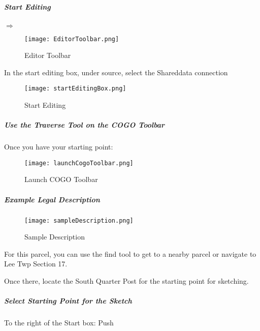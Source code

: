 \subparagraph{Start Editing}

{\bigbtn
\noindent {}$\Rightarrow$
}

\begin{figure}[h!]
\centering
    \texttt{[image: EditorToolbar.png]}
\vspace{-.1in}

\caption{Editor Toolbar}
\end{figure}

In the start editing box, under source, select the Shareddata connection

\begin{figure}[h!]
\centering
    \texttt{[image: startEditingBox.png]}

\caption{Start Editing}
\end{figure}
%
\clearpage

\subparagraph{Use the Traverse Tool on the COGO Toolbar}

Once you have your starting point:
\vspace{.5in}

\vspace{.5in}



\begin{figure}[h!]
\centering
    \texttt{[image: launchCogoToolbar.png]}

\caption{Launch COGO Toolbar}
\end{figure}
%
\clearpage

\subparagraph{Example Legal Description}

\begin{figure}[h!]
\centering
    \texttt{[image: sampleDescription.png]}

\caption{Sample Description}
\end{figure}

\noindent For this parcel, you can use the find tool to get to a nearby parcel or navigate to Lee Twp Section 17.
\vspace{.1in}

\noindent Once there, locate the South Quarter Post for the starting point for sketching.

\subparagraph{Select Starting Point for the Sketch}

To the right of the Start box: {\bigbtn Push }

